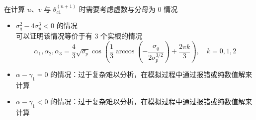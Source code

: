\documentclass[UTF8]{ctexart}
\begin{document}
				在计算 $u$、$v$ 与 $\theta_{c1}^{(n + 1)}$ 时需要考虑虚数与分母为 0 情况
				\begin{itemize}
					\item $\sigma_q^2 - 4 \sigma_p^3 < 0$ 的情况 \\
						可以证明该情况等价于有 3 个实根的情况
						\begin{equation}
							\alpha_1, \alpha_2, \alpha_3 = \frac{4}{3}\sqrt{\sigma_p}\cos\left(\frac{1}{3}\arccos\left(-\frac{\sigma_q}{2\sigma_p^{3/2}}\right) + \frac{2\pi k}{3}\right),\quad k=0,1,2
						\end{equation}
					\item $\alpha - \gamma_{1} = 0$ 的情况：过于复杂难以分析，在模拟过程中通过报错或纯数值解来计算
					\item $\alpha - \gamma_{1} < 0$ 的情况：过于复杂难以分析，在模拟过程中通过报错或纯数值解来计算
				\end{itemize}
\end{document}
